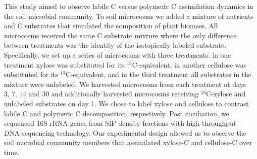 This study aimed to observe labile C versus polymeric C assimilation dynamics
in the soil microbial community. To soil microcosms we added a mixture of
nutrients and C substrates that simulated the composition of plant biomass. All
microcosms received the same C substrate mixture where the only difference
between treatments was the identity of the isotopically labeled substrate.
Specifically, we set up a series of microcosms with three treatments: in one
treatment xylose was substituted for its $^{13}$C-equivalent, in another
cellulose was substituted for its $^{13}$C-equivalent, and in the third
treatment all substrates in the mixture were unlabeled. We harvested microcosms
from each treatment at days 3, 7, 14 and 30 and additionally harvested
microcosms receiving $^{13}$C-xylose and unlabeled substrates on day 1. We
chose to label xylose and cellulose to contrast labile C and polymeric
C decomposition, respectively. Post incubation, we sequenced 16S rRNA genes
from SIP density fractions with high throughput DNA sequencing technology. Our
experimental design allowed us to observe the soil microbial community members
that assimilated xylose-C and cellulose-C over time.
